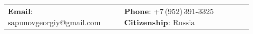 \documentclass[letterpaper, 11pt]{article}
\begin{document}
	
	
	
	\vspace{0.5cm}
	\begin{center}
		\begin{tabular}{lll}
			\textbf{Email}: sapunovgeorgiy@gmail.com      &
			
			\textbf{Phone}: +7\,(952)\,391-3325
			\hspace{0.4in} \textbf{Citizenship}: Russia
		\end{tabular}
	\end{center}
	
	
	\setlength{\tabcolsep}{8pt}
	
\end{document}
